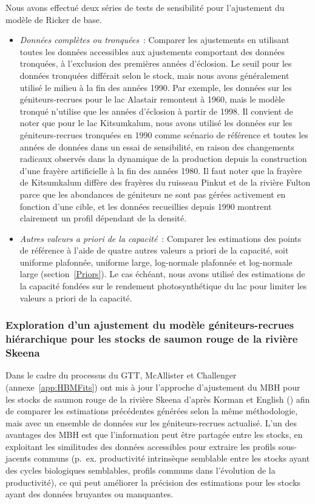 \documentclass[french,11pt]{book}
\begin{document}
Nous avons effectué deux séries de tests de sensibilité pour l'ajustement du modèle de Ricker de base.
\begin{itemize}

\item
  \emph{Données complètes ou tronquées}~: Comparer les ajustements en utilisant toutes les données accessibles aux ajustements comportant des données tronquées, à l'exclusion des premières années d'éclosion. Le seuil pour les données tronquées différait selon le stock, mais nous avons généralement utilisé le milieu à la fin des années 1990. Par exemple, les données sur les géniteurs-recrues pour le lac Alastair remontent à 1960, mais le modèle tronqué n'utilise que les années d'éclosion à partir de 1998. Il convient de noter que pour le lac Kitsumkalum, nous avons utilisé les données sur les géniteurs-recrues tronquées en 1990 comme scénario de référence et toutes les années de données dans un essai de sensibilité, en raison des changements radicaux observés dans la dynamique de la production depuis la construction d'une frayère artificielle à la fin des années 1980. Il faut noter que la frayère de Kitsumkalum diffère des frayères du ruisseau Pinkut et de la rivière Fulton parce que les abondances de géniteurs ne sont pas gérées activement en fonction d'une cible, et les données recueillies depuis 1990 montrent clairement un profil dépendant de la densité.
\item
  \emph{Autres valeurs a priori de la capacité}~: Comparer les estimations des points de référence à l'aide de quatre autres valeurs a priori de la capacité, soit uniforme plafonnée, uniforme large, log-normale plafonnée et log-normale large (section~\ref{Priors}). Le cas échéant, nous avons utilisé des estimations de la capacité fondées sur le rendement photosynthétique du lac pour limiter les valeurs a priori de la capacité.
\end{itemize}
\subsubsection{Exploration d'un ajustement du modèle géniteurs-recrues hiérarchique pour les stocks de saumon rouge de la rivière Skeena}\label{HBMExploration}

Dans le cadre du processus du GTT, McAllister et Challenger (annexe~\ref{app:HBMFits}) ont mis à jour l'approche d'ajustement du MBH pour les stocks de saumon rouge de la rivière Skeena d'après Korman et English () afin de comparer les estimations précédentes générées selon la même méthodologie, mais avec un ensemble de données sur les géniteurs-recrues actualisé. L'un des avantages des MBH est que l'information peut être partagée entre les stocks, en exploitant les similitudes des données accessibles pour extraire les profils sous-jacents communs (p.~ex. productivité intrinsèque semblable entre les stocks ayant des cycles biologiques semblables, profils communs dans l'évolution de la productivité), ce qui peut améliorer la précision des estimations pour les stocks ayant des données bruyantes ou manquantes.
\end{document}
